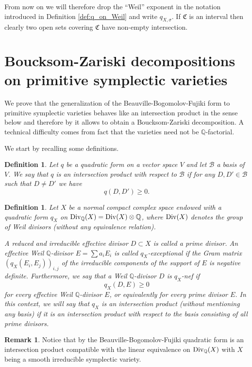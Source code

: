 \documentclass[12pt,reqno]{amsart}
\def\Q{{\mathbb Q}}
\def\Div{\mathop{\rm Div}\nolimits}
\newtheorem{definition}[thm]{Definition}
\theoremstyle{plain}
\theoremstyle{definition}
\newtheorem{remark}[thm]{Remark}
\begin{document}
From now on we will therefore drop the ``Weil'' exponent in the notation introduced in Definition \ref{def:q_on_Weil} and  write $q_{X,\sigma}$. 
If $\mathfrak{C}$ is an interval then  clearly two open sets covering $\mathfrak{C}$ have non-empty intersection.

\section{Boucksom-Zariski decompositions on primitive symplectic  varieties}

We prove that the generalization of the Beauville-Bogomolov-Fujiki form to primitive symplectic varieties  behaves like an intersection product in the sense below and therefore by \cite{Baueretal} it allows to obtain a Boucksom-Zariski decomposition.  A technical difficulty comes from fact that the varieties need not be $\Q$-factorial.


We start by recalling some definitions.
 \begin{definition}\label{def:intersection product} Let $q$ be a quadratic form on a vector space $V$ and let $\mathcal B$ a basis of $V$.  We say that $q$ is an intersection product with respect to $\mathcal B$ if for any $D,D'\in \mathcal B$ such that $D\neq D'$ we have
\begin{equation}\label{eq:star}
q(D,D')\geq 0. 
\end{equation}
 \end{definition}

\begin{definition} \label{prime} 
Let $X$ be a normal compact complex space endowed with a quadratic form $q_{X}$ on $\Div_{\Q}(X)=\Div(X)\otimes \Q$, where $\Div(X)$ denotes the group of Weil divisors (without any equivalence relation).

A reduced and irreducible effective divisor $D\subset X$ is called a prime divisor. An effective Weil $\Q$-divisor $E=\sum a_i E_i$ 
is called $q_{X}$-exceptional if the Gram matrix   $(q_{X}(E_i,E_j))_{i,j}$ of the irreducible components of the support of $E$ 
is negative definite.  
Furthermore, we say that a Weil $\Q$-divisor $D$ is $q_{X}$-nef if 
$$q_{X}(D,E)\geq 0 $$ 
for every effective 
Weil $\Q$-divisor $E$, or equivalently for every prime divisor $E$.
In this context, we will say that $q_X$ is an intersection product (without mentioning any basis) if it is an intersection product with respect to the basis consisting of all prime divisors.
\end{definition}
 \begin{remark}
    Notice that by \cite[Proposition 4.2, item (ii)]{Boucksom1} the Beauville-Bogomolov-Fujiki quadratic form is an intersection product compatible with the linear equivalence on $\Div_{\Q}(X)$ with $X$ being a smooth irreducible symplectic variety. 

\end{remark}
\end{document}
